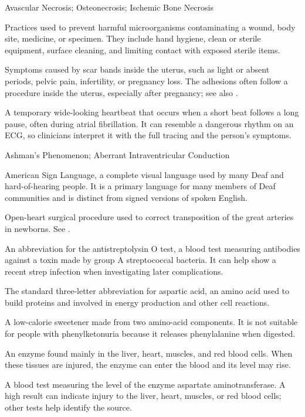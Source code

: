 \synonyms
Avascular Necrosis; Osteonecrosis; Ischemic Bone Necrosis

 Practices used to prevent harmful microorganisms contaminating a wound, body site, medicine, or specimen. They include hand hygiene, clean or sterile equipment, surface cleaning, and limiting contact with exposed sterile items.

 Symptoms caused by scar bands inside the uterus, such as light or absent periods, pelvic pain, infertility, or pregnancy loss. The adhesions often follow a procedure inside the uterus, especially after pregnancy; see also .

 A temporary wide-looking heartbeat that occurs when a short beat follows a long pause, often during atrial fibrillation. It can resemble a dangerous rhythm on an ECG, so clinicians interpret it with the full tracing and the person’s symptoms.

\synonyms
Ashman's Phenomenon; Aberrant Intraventricular Conduction

 American Sign Language, a complete visual language used by many Deaf and hard-of-hearing people. It is a primary language for many members of Deaf communities and is distinct from signed versions of spoken English.

 Open-heart surgical procedure used to correct transposition of the great arteries in newborns. See .

 An abbreviation for the antistreptolysin O test, a blood test measuring antibodies against a toxin made by group A streptococcal bacteria. It can help show a recent strep infection when investigating later complications.

 The standard three-letter abbreviation for aspartic acid, an amino acid used to build proteins and involved in energy production and other cell reactions.

 A low-calorie sweetener made from two amino-acid components. It is not suitable for people with phenylketonuria because it releases phenylalanine when digested.

 An enzyme found mainly in the liver, heart, muscles, and red blood cells. When these tissues are injured, the enzyme can enter the blood and its level may rise.

 A blood test measuring the level of the enzyme aspartate aminotransferase. A high result can indicate injury to the liver, heart, muscles, or red blood cells; other tests help identify the source.

